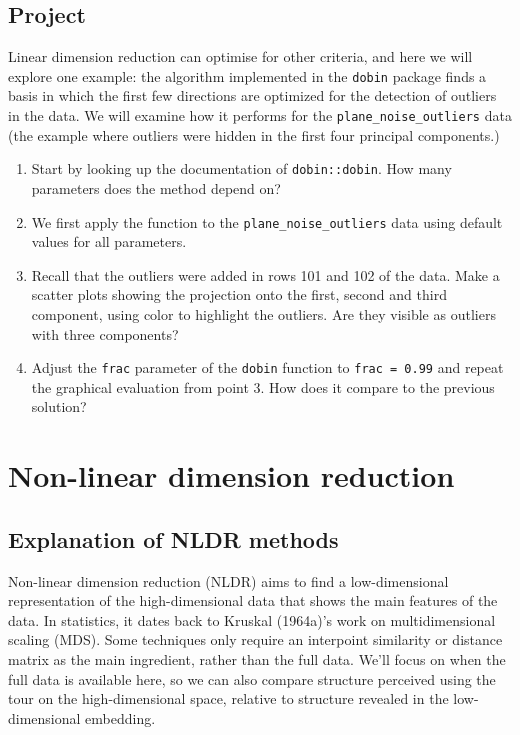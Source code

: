 \documentclass[
  letterpaper,
]{krantz}
\providecommand{\tightlist}{%
  \setlength{\itemsep}{0pt}\setlength{\parskip}{0pt}}\usepackage{longtable,booktabs,array}
\begin{document}
\section*{Project}\label{project}


Linear dimension reduction can optimise for other criteria, and here we
will explore one example: the algorithm implemented in the
\texttt{dobin} package finds a basis in which the first few directions
are optimized for the detection of outliers in the data. We will examine
how it performs for the \texttt{plane\_noise\_outliers} data (the
example where outliers were hidden in the first four principal
components.)

\begin{enumerate}
\def\labelenumi{\arabic{enumi}.}
\tightlist
\item
  Start by looking up the documentation of \texttt{dobin::dobin}. How
  many parameters does the method depend on?
\item
  We first apply the function to the \texttt{plane\_noise\_outliers}
  data using default values for all parameters.
\item
  Recall that the outliers were added in rows 101 and 102 of the data.
  Make a scatter plots showing the projection onto the first, second and
  third component, using color to highlight the outliers. Are they
  visible as outliers with three components?
\item
  Adjust the \texttt{frac} parameter of the \texttt{dobin} function to
  \texttt{frac\ =\ 0.99} and repeat the graphical evaluation from point
  3. How does it compare to the previous solution?
\end{enumerate}


\chapter{Non-linear dimension
reduction}\label{non-linear-dimension-reduction}

\section{Explanation of NLDR methods}\label{explanation-of-nldr-methods}

Non-linear dimension reduction (NLDR) aims to find a low-dimensional
representation of the high-dimensional data that shows the main features
of the data. In statistics, it dates back to Kruskal (1964a)'s work on
multidimensional scaling (MDS). Some techniques only require an
interpoint similarity or distance matrix as the main ingredient, rather
than the full data. We'll focus on when the full data is available here,
so we can also compare structure perceived using the tour on the
high-dimensional space, relative to structure revealed in the
low-dimensional embedding.
\end{document}

